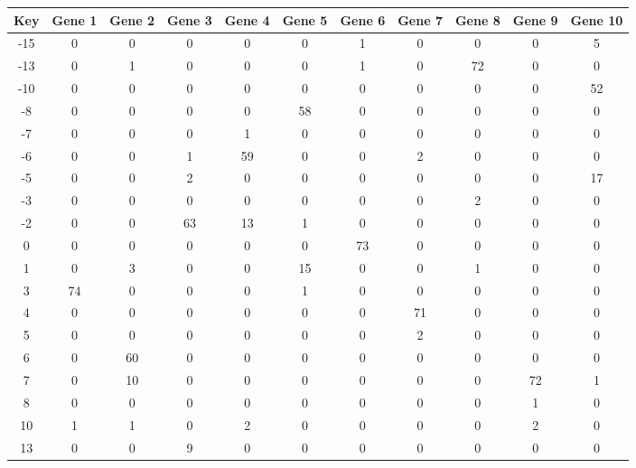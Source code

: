 \begin{tabular}{|c|c|c|c|c|c|c|c|c|c|c|}
\hline
Key & Gene 1 & Gene 2 & Gene 3 & Gene 4 & Gene 5 & Gene 6 & Gene 7 & Gene 8 & Gene 9 & Gene 10 \\
\hline
-15 & 0 & 0 & 0 & 0 & 0 & 1 & 0 & 0 & 0 & 5 \\
-13 & 0 & 1 & 0 & 0 & 0 & 1 & 0 & 72 & 0 & 0 \\
-10 & 0 & 0 & 0 & 0 & 0 & 0 & 0 & 0 & 0 & 52 \\
-8 & 0 & 0 & 0 & 0 & 58 & 0 & 0 & 0 & 0 & 0 \\
-7 & 0 & 0 & 0 & 1 & 0 & 0 & 0 & 0 & 0 & 0 \\
-6 & 0 & 0 & 1 & 59 & 0 & 0 & 2 & 0 & 0 & 0 \\
-5 & 0 & 0 & 2 & 0 & 0 & 0 & 0 & 0 & 0 & 17 \\
-3 & 0 & 0 & 0 & 0 & 0 & 0 & 0 & 2 & 0 & 0 \\
-2 & 0 & 0 & 63 & 13 & 1 & 0 & 0 & 0 & 0 & 0 \\
0 & 0 & 0 & 0 & 0 & 0 & 73 & 0 & 0 & 0 & 0 \\
1 & 0 & 3 & 0 & 0 & 15 & 0 & 0 & 1 & 0 & 0 \\
3 & 74 & 0 & 0 & 0 & 1 & 0 & 0 & 0 & 0 & 0 \\
4 & 0 & 0 & 0 & 0 & 0 & 0 & 71 & 0 & 0 & 0 \\
5 & 0 & 0 & 0 & 0 & 0 & 0 & 2 & 0 & 0 & 0 \\
6 & 0 & 60 & 0 & 0 & 0 & 0 & 0 & 0 & 0 & 0 \\
7 & 0 & 10 & 0 & 0 & 0 & 0 & 0 & 0 & 72 & 1 \\
8 & 0 & 0 & 0 & 0 & 0 & 0 & 0 & 0 & 1 & 0 \\
10 & 1 & 1 & 0 & 2 & 0 & 0 & 0 & 0 & 2 & 0 \\
13 & 0 & 0 & 9 & 0 & 0 & 0 & 0 & 0 & 0 & 0 \\
\hline
\end{tabular}